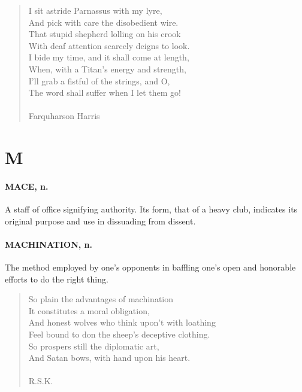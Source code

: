 \documentclass[11pt]{article}
\begin{document}
\begin{quote}   I sit astride Parnassus with my lyre, \\
  And pick with care the disobedient wire. \\
  That stupid shepherd lolling on his crook \\
  With deaf attention scarcely deigns to look. \\
  I bide my time, and it shall come at length, \\
  When, with a Titan's energy and strength, \\
  I'll grab a fistful of the strings, and O, \\
  The word shall suffer when I let them go! \\
 \\
Farquharson Harris \end{quote}




\section*{M}



\paragraph{MACE, n.}  A staff of office signifying authority.  Its form, that of a
heavy club, indicates its original purpose and use in dissuading from
dissent.

\paragraph{MACHINATION, n.}  The method employed by one's opponents in baffling
one's open and honorable efforts to do the right thing.

\begin{quote}   So plain the advantages of machination \\
  It constitutes a moral obligation, \\
  And honest wolves who think upon't with loathing \\
  Feel bound to don the sheep's deceptive clothing. \\
  So prospers still the diplomatic art, \\
  And Satan bows, with hand upon his heart. \\
 \\
R.S.K. \end{quote}
\end{document}
